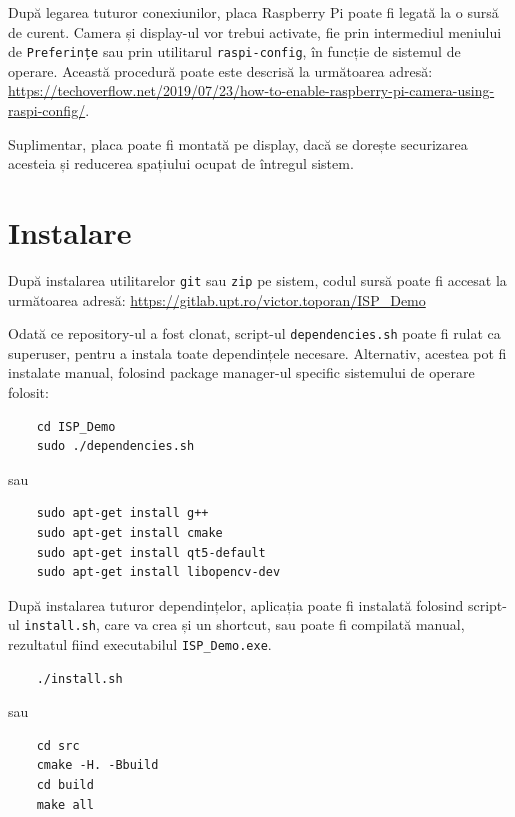 După legarea tuturor conexiunilor, placa Raspberry Pi poate fi legată la o sursă de curent. Camera și display-ul
vor trebui activate, fie prin intermediul meniului de \verb|Preferințe| sau prin utilitarul \verb|raspi-config|,
în funcție de sistemul de operare. Această procedură poate este descrisă la următoarea adresă:
\url{https://techoverflow.net/2019/07/23/how-to-enable-raspberry-pi-camera-using-raspi-config/}.

Suplimentar, placa poate fi montată pe display, dacă se dorește securizarea acesteia și reducerea
spațiului ocupat de întregul sistem.

\section{Instalare}

După instalarea utilitarelor \verb|git| sau \verb|zip| pe sistem, codul sursă poate fi accesat la următoarea adresă:
\url{https://gitlab.upt.ro/victor.toporan/ISP_Demo}

Odată ce repository-ul a fost clonat, script-ul \verb|dependencies.sh| poate fi rulat ca superuser, pentru
a instala toate dependințele necesare. Alternativ, acestea pot fi instalate manual, folosind package
manager-ul specific sistemului de operare folosit:

\begin{code}
	\begin{lstlisting}
    cd ISP_Demo
    sudo ./dependencies.sh
    \end{lstlisting}
	sau
	\begin{lstlisting}
    sudo apt-get install g++
    sudo apt-get install cmake
    sudo apt-get install qt5-default
    sudo apt-get install libopencv-dev
    \end{lstlisting}
\end{code}

După instalarea tuturor dependințelor, aplicația poate fi instalată folosind script-ul \verb|install.sh|, care
va crea și un shortcut, sau poate fi compilată manual, rezultatul fiind executabilul \verb|ISP_Demo.exe|.

\begin{code}
	\begin{lstlisting}
    ./install.sh
    \end{lstlisting}
	sau
	\begin{lstlisting}
    cd src
    cmake -H. -Bbuild
    cd build
    make all
    \end{lstlisting}
\end{code}

